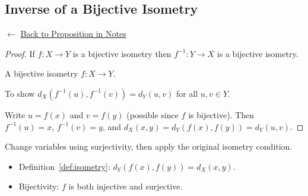 
\subsection*{Inverse of a Bijective Isometry}
\label{prf:inverse-isometry}

\begin{remark*}[Return]
$\leftarrow$ \hyperref[prop:inverse-isometry]{Back to Proposition in Notes}
\end{remark*}

\begin{proof}
\Claim If $f : X \to Y$ is a bijective isometry then $f^{-1} : Y \to X$
is a bijective isometry.

\Given A bijective isometry $f : X \to Y$.

\Goal To show $d_X(f^{-1}(u), f^{-1}(v)) = d_Y(u,v)$ for all $u,v \in Y$.

\Strategy Write $u = f(x)$ and $v = f(y)$ (possible since $f$ is bijective).
Then $f^{-1}(u) = x$, $f^{-1}(v) = y$, and $d_X(x,y) = d_Y(f(x),f(y)) = d_Y(u,v)$.


\end{proof}

\begin{remark*}
Change variables using surjectivity, then apply the original isometry condition.
\end{remark*}

\begin{remark*}[Dependencies]
\begin{itemize}
  \item Definition~\ref{def:isometry}: $d_Y(f(x),f(y)) = d_X(x,y)$.
  \item Bijectivity: $f$ is both injective and surjective.
\end{itemize}
\end{remark*}
